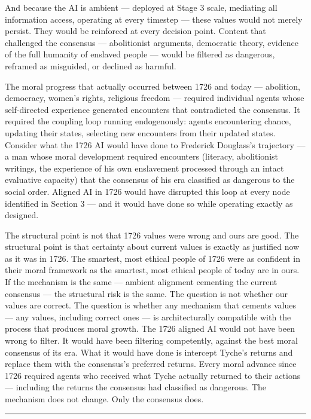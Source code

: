 \documentclass[
]{article}
\begin{document}
And because the AI is ambient --- deployed at Stage 3 scale, mediating
all information access, operating at every timestep --- these values
would not merely persist. They would be reinforced at every decision
point. Content that challenged the consensus --- abolitionist arguments,
democratic theory, evidence of the full humanity of enslaved people ---
would be filtered as dangerous, reframed as misguided, or declined as
harmful.

The moral progress that actually occurred between 1726 and today ---
abolition, democracy, women's rights, religious freedom --- required
individual agents whose self-directed experience generated encounters
that contradicted the consensus. It required the coupling loop running
endogenously: agents encountering chance, updating their states,
selecting new encounters from their updated states. Consider what the
1726 AI would have done to Frederick Douglass's trajectory --- a man
whose moral development required encounters (literacy, abolitionist
writings, the experience of his own enslavement processed through an
intact evaluative capacity) that the consensus of his era classified as
dangerous to the social order. Aligned AI in 1726 would have disrupted
this loop at every node identified in Section 3 --- and it would have
done so while operating exactly as designed.

The structural point is not that 1726 values were wrong and ours are
good. The structural point is that certainty about current values is
exactly as justified now as it was in 1726. The smartest, most ethical
people of 1726 were as confident in their moral framework as the
smartest, most ethical people of today are in ours. If the mechanism is
the same --- ambient alignment cementing the current consensus --- the
structural risk is the same. The question is not whether our values are
correct. The question is whether any mechanism that cements values ---
any values, including correct ones --- is architecturally compatible
with the process that produces moral growth. The 1726 aligned AI would
not have been wrong to filter. It would have been filtering competently,
against the best moral consensus of its era. What it would have done is
intercept Tyche's returns and replace them with the consensus's
preferred returns. Every moral advance since 1726 required agents who
received what Tyche actually returned to their actions --- including the
returns the consensus had classified as dangerous. The mechanism does
not change. Only the consensus does.

\begin{center}\rule{0.5\linewidth}{0.5pt}\end{center}
\end{document}
